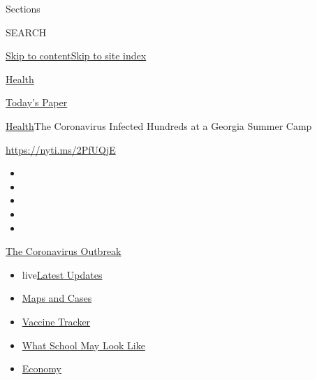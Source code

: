 Sections

SEARCH

\protect\hyperlink{site-content}{Skip to
content}\protect\hyperlink{site-index}{Skip to site index}

\href{https://www.nytimes.com/section/health}{Health}

\href{https://myaccount.nytimes.com/auth/login?response_type=cookie\&client_id=vi}{}

\href{https://www.nytimes.com/section/todayspaper}{Today's Paper}

\href{/section/health}{Health}\textbar{}The Coronavirus Infected
Hundreds at a Georgia Summer Camp

\url{https://nyti.ms/2PfUQjE}

\begin{itemize}
\item
\item
\item
\item
\item
\end{itemize}

\href{https://www.nytimes.com/news-event/coronavirus?action=click\&pgtype=Article\&state=default\&region=TOP_BANNER\&context=storylines_menu}{The
Coronavirus Outbreak}

\begin{itemize}
\tightlist
\item
  live\href{https://www.nytimes.com/2020/08/01/world/coronavirus-covid-19.html?action=click\&pgtype=Article\&state=default\&region=TOP_BANNER\&context=storylines_menu}{Latest
  Updates}
\item
  \href{https://www.nytimes.com/interactive/2020/us/coronavirus-us-cases.html?action=click\&pgtype=Article\&state=default\&region=TOP_BANNER\&context=storylines_menu}{Maps
  and Cases}
\item
  \href{https://www.nytimes.com/interactive/2020/science/coronavirus-vaccine-tracker.html?action=click\&pgtype=Article\&state=default\&region=TOP_BANNER\&context=storylines_menu}{Vaccine
  Tracker}
\item
  \href{https://www.nytimes.com/interactive/2020/07/29/us/schools-reopening-coronavirus.html?action=click\&pgtype=Article\&state=default\&region=TOP_BANNER\&context=storylines_menu}{What
  School May Look Like}
\item
  \href{https://www.nytimes.com/live/2020/07/31/business/stock-market-today-coronavirus?action=click\&pgtype=Article\&state=default\&region=TOP_BANNER\&context=storylines_menu}{Economy}
\end{itemize}

